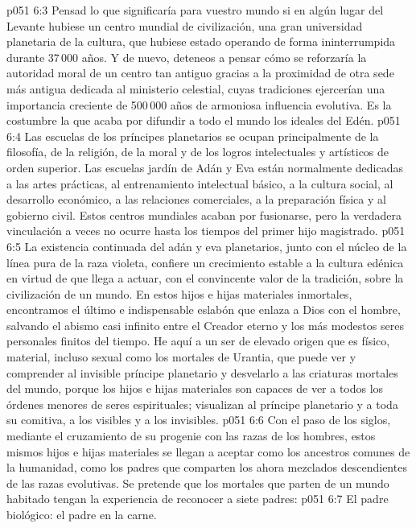 \vs p051 6:3 Pensad lo que significaría para vuestro mundo si en algún lugar del Levante hubiese un centro mundial de civilización, una gran universidad planetaria de la cultura, que hubiese estado operando de forma ininterrumpida durante 37\,000 años. Y de nuevo, deteneos a pensar cómo se reforzaría la autoridad moral de un centro tan antiguo gracias a la proximidad de otra sede más antigua dedicada al ministerio celestial, cuyas tradiciones ejercerían una importancia creciente de 500\,000 años de armoniosa influencia evolutiva. Es la costumbre la que acaba por difundir a todo el mundo los ideales del Edén.
\vs p051 6:4 Las escuelas de los príncipes planetarios se ocupan principalmente de la filosofía, de la religión, de la moral y de los logros intelectuales y artísticos de orden superior. Las escuelas jardín de Adán y Eva están normalmente dedicadas a las artes prácticas, al entrenamiento intelectual básico, a la cultura social, al desarrollo económico, a las relaciones comerciales, a la preparación física y al gobierno civil. Estos centros mundiales acaban por fusionarse, pero la verdadera vinculación a veces no ocurre hasta los tiempos del primer hijo magistrado.
\vs p051 6:5 \pc La existencia continuada del adán y eva planetarios, junto con el núcleo de la línea pura de la raza violeta, confiere un crecimiento estable a la cultura edénica en virtud de que llega a actuar, con el convincente valor de la tradición, sobre la civilización de un mundo. En estos hijos e hijas materiales inmortales, encontramos el último e indispensable eslabón que enlaza a Dios con el hombre, salvando el abismo casi infinito entre el Creador eterno y los más modestos seres personales finitos del tiempo. He aquí a un ser de elevado origen que es físico, material, incluso sexual como los mortales de Urantia, que puede ver y comprender al invisible príncipe planetario y desvelarlo a las criaturas mortales del mundo, porque los hijos e hijas materiales son capaces de ver a todos los órdenes menores de seres espirituales; visualizan al príncipe planetario y a toda su comitiva, a los visibles y a los invisibles.
\vs p051 6:6 Con el paso de los siglos, mediante el cruzamiento de su progenie con las razas de los hombres, estos mismos hijos e hijas materiales se llegan a aceptar como los ancestros comunes de la humanidad, como los padres que comparten los ahora mezclados descendientes de las razas evolutivas. Se pretende que los mortales que parten de un mundo habitado tengan la experiencia de reconocer a siete padres:
\vs p051 6:7 El padre biológico: el padre en la carne.

